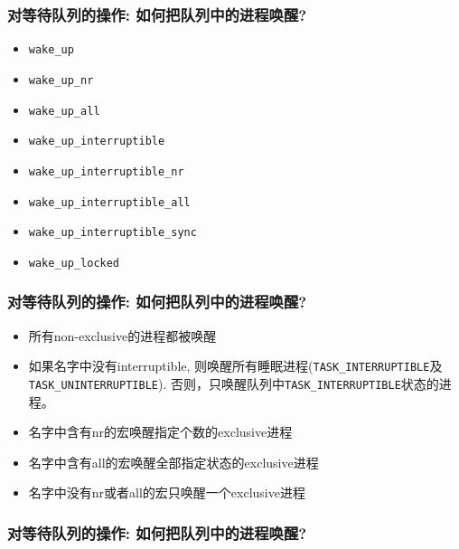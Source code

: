 \documentclass[xcolor=svgnames]{beamer}
\begin{document}
\begin{CJK*}{UTF8}{gbsn}
\begin{frame}[fragile]
\frametitle{对等待队列的操作: 如何把队列中的进程唤醒?}
\begin{itemize}
\item \verb|wake_up|
\item \verb|wake_up_nr|
\item \verb|wake_up_all|
\item \verb|wake_up_interruptible|
\item \verb|wake_up_interruptible_nr|
\item \verb|wake_up_interruptible_all|
\item \verb|wake_up_interruptible_sync|
\item \verb|wake_up_locked|
\end{itemize}
\end{frame}

\begin{frame}[fragile]
\frametitle{对等待队列的操作: 如何把队列中的进程唤醒?}
\begin{itemize}
\item 所有non-exclusive的进程都被唤醒
\item 如果名字中没有interruptible, 则唤醒所有睡眠进程(\verb|TASK_INTERRUPTIBLE|及\verb|TASK_UNINTERRUPTIBLE|).
否则，只唤醒队列中\verb|TASK_INTERRUPTIBLE|状态的进程。
\item 名字中含有nr的宏唤醒指定个数的exclusive进程
\item 名字中含有all的宏唤醒全部指定状态的exclusive进程
\item 名字中没有nr或者all的宏只唤醒一个exclusive进程
\end{itemize}
\end{frame}

\begin{frame}[fragile]
\frametitle{对等待队列的操作: 如何把队列中的进程唤醒?}
\end{frame}


\end{CJK*}
\end{document}
